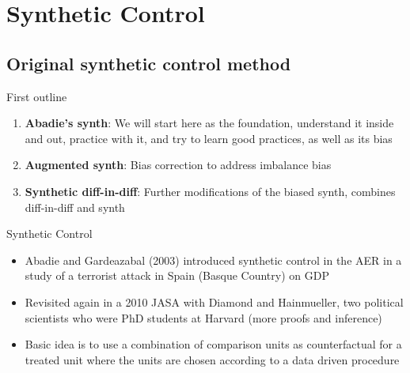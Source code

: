\documentclass{beamer}
\begin{document}



   

\section{Synthetic Control}



\subsection{Original synthetic control method}


\begin{frame}{First outline}

\begin{enumerate}
\item \textbf{Abadie's synth}: We will start here as the foundation, understand it inside and out, practice with it, and try to learn good practices, as well as its bias
\item \textbf{Augmented synth}: Bias correction to address imbalance bias
\item \textbf{Synthetic diff-in-diff}: Further modifications of the biased synth, combines diff-in-diff and synth
\end{enumerate}

\end{frame}



\begin{frame}{Synthetic Control}
	
	\begin{itemize}
	\item Abadie and Gardeazabal (2003) introduced synthetic control in the AER in a study of a terrorist attack in Spain (Basque Country) on GDP
	\item Revisited again in a 2010 JASA with Diamond and Hainmueller, two political scientists who were PhD students at Harvard (more proofs and inference)
	\item Basic idea is to use a combination of comparison units as counterfactual for a treated unit where the units are chosen according to a data driven procedure
	\end{itemize}
\end{frame}
\end{document}

